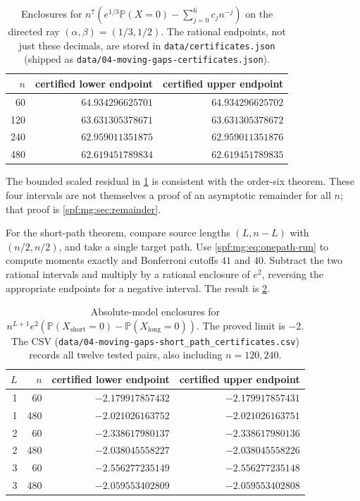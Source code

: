 \documentclass[11pt]{article}
\numberwithin{equation}{section}
\theoremstyle{definition}
\theoremstyle{remark}
\theoremstyle{definition}
\newcommand{\Pp}{\mathbb P}
\begin{document}
\begin{table}[htbp]
\centering\small
\renewcommand{\arraystretch}{1.16}
\begin{tabular}{@{}rrr@{}}
\toprule
$n$ & certified lower endpoint & certified upper endpoint\\
\midrule
60  & $64.934296625701$ & $64.934296625702$\\
120 & $63.631305378671$ & $63.631305378672$\\
240 & $62.959011351875$ & $62.959011351876$\\
480 & $62.619451789834$ & $62.619451789835$\\
\bottomrule
\end{tabular}
\caption{Enclosures for $n^7(e^{1/3}\Pp(X=0)-\sum_{j=0}^6c_jn^{-j})$
on the directed ray $(\alpha,\beta)=(1/3,1/2)$. The rational endpoints,
not just these decimals, are stored in \texttt{data/certificates.json}
(shipped as \texttt{data/04-moving-gaps-certificates.json}).}
\label{spf:mg:tab:certified}
\end{table}

The bounded scaled residual in \cref{spf:mg:tab:certified} is consistent with
the order-six theorem. These four intervals are not themselves a proof
of an asymptotic remainder for all $n$; that proof is
\cref{spf:mg:sec:remainder}.

For the short-path theorem, compare source lengths $(L,n-L)$ with
$(n/2,n/2)$, and take a single target path. Use
\eqref{spf:mg:eq:onepath-run} to compute moments exactly and Bonferroni cutoffs
$41$ and $40$. Subtract the two rational intervals and multiply by a
rational enclosure of $e^2$, reversing the appropriate endpoints for a
negative interval. The result is \cref{spf:mg:tab:short-cert}.

\begin{table}[htbp]
\centering\small
\renewcommand{\arraystretch}{1.16}
\begin{tabular}{@{}rrrr@{}}
\toprule
$L$ & $n$ & certified lower endpoint & certified upper endpoint\\
\midrule
1 & 60  & $-2.179917857432$ & $-2.179917857431$\\
1 & 480 & $-2.021026163752$ & $-2.021026163751$\\
2 & 60  & $-2.338617980137$ & $-2.338617980136$\\
2 & 480 & $-2.038045558227$ & $-2.038045558226$\\
3 & 60  & $-2.556277235149$ & $-2.556277235148$\\
3 & 480 & $-2.059553402809$ & $-2.059553402808$\\
\bottomrule
\end{tabular}
\caption{Absolute-model enclosures for
$n^{L+1}e^2(\Pp(X_{\mathrm{short}}=0)-\Pp(X_{\mathrm{long}}=0))$.
The proved limit is $-2$. The CSV
(\texttt{data/04-moving-gaps-short\_path\_certificates.csv}) records all twelve
tested pairs, also including $n=120,240$.}
\label{spf:mg:tab:short-cert}
\end{table}
\end{document}
